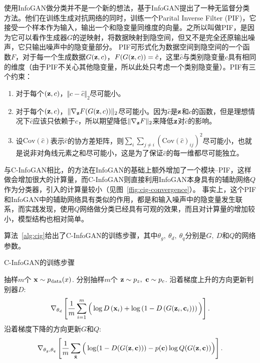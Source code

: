 使用InfoGAN做分类并不是一个新的想法，\citet{zhang2018cramer}基于InfoGAN提出了一种无监督分类方法。他们在训练生成对抗网络的同时，训练一个Parital Inverse Filter (PIF)，它接受一个样本作为输入，输出一个和隐变量同维度的向量。之所以叫做PIF，是因为它可以看作生成器$G$的逆映射，将数据映射到隐空间，但又不是完全还原输出噪声，它只输出噪声中的隐变量部分。
PIF可形式化为数据空间到隐空间的一个函数$F$，对于每一个生成数据$G(\mathbf{z}, c)$，$F(G(\mathbf{z},c)) = \hat{c}$，这里$\hat{c}$与类别隐变量$c$具有相同的维度（由于PIF不关心其他隐变量，所以此处只考虑一个类别隐变量）。PIF有三个约束：
\begin{enumerate}
  \item 对于每个$(\mathbf{z},c)$，$\Vert c -\hat{c}\Vert_2$尽可能小。
  \item 对于每个$(\mathbf{z},c)$，$\Vert \nabla_{\mathbf{z}}F(G(\mathbf{z},c)) \Vert_2$尽可能小。因为$\hat{c}$是$\mathbf{z}$和$c$的函数，但是理想情况下$\hat{c}$应该只依赖于$c$，所以期望降低$\Vert \nabla_{\mathbf{z}}F \Vert_2$来降低$\mathbf{z}$对$\hat{c}$的影响。
  \item 设$\text{Cov}(\hat{c})$表示$\hat{c}$的协方差矩阵，则$\sum_i\sum_{j\neq i} (\text{Cov}(\hat{c})_{ij})^2$尽可能小，也就是说非对角线元素之和尽可能小，这是为了保证$\hat{c}$的每一维都尽可能独立。
\end{enumerate}
与C-InfoGAN相比，\citet{zhang2018cramer}的方法在InfoGAN的基础上额外增加了一个模块--PIF，这样做会增加很大的计算量，而C-InfoGAN则直接利用InfoGAN本身具有的辅助网络$Q$作为分类器，引入的计算量较小（见图~\ref{ffig:cig-convergence}）。
事实上，这个PIF和InfoGAN中的辅助网络具有类似的作用，都是和输入噪声中的隐变量发生联系，而实践发现，使用$Q$网络做分类已经具有可观的效果，而且对计算量的增加较小，模型结构也相对简单。

算法~\ref{alg:cig}给出了C-InfoGAN的训练步骤，其中$\theta_g,~\theta_d,~\theta_q$分别是$G, ~D$和$Q$的网络参数。
\begin{algorithm}[htbp]
  \small
  \caption{C-InfoGAN的训练步骤}
  \label{alg:cig}
  \begin{algorithmic}[1]
      \State 抽样$m$个 $\mathbf{x} \sim p_{\text{data}}(x)$.
      \State 分别抽样$m$个 $\mathbf{z}\sim p_z, ~\mathbf{c}\sim p_c$.
      \State 沿着梯度上升的方向更新判别器$D$:
      \[
        \nabla_{\theta_d} \left[ 
          \frac{1}{m} \sum_{i=1}^m \Big( 
            \log D\left(\mathbf{x}_i\right) + 
            \log\left( 1 - D\left( G(\mathbf{z}_i, \mathbf{c}_i) \right) \right)
          \Big)
        \right].
      \]
      \State 沿着梯度下降的方向更新$G$和$Q$:
      \[
        \nabla_{\theta_g,\theta_q} \left[ 
          \frac{1}{m} \sum_{\tilde{\mathbf{x}}} \Big(
            \log(1 - D(G(\mathbf{z},\mathbf{c}))) -
            p(\mathbf{c})\log Q(G(\mathbf{z}, \mathbf{c}))
          \Big)
        \right].
      \]
    \EndFor
  \end{algorithmic}
\end{algorithm}


